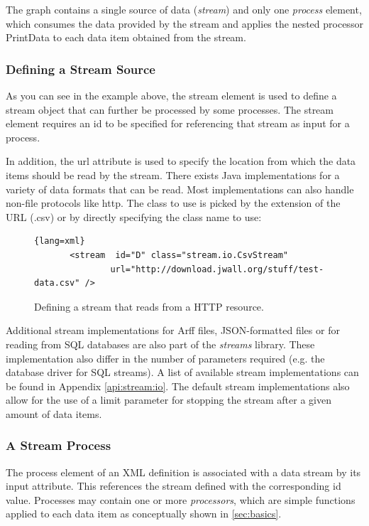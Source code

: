 The graph contains a single source of data ({\em stream}) and only
one {\em process} element, which consumes the data provided by the
stream and applies the nested processor {\ttfamily PrintData} to
each data item obtained from the stream.

\subsubsection{\label{sec:defineStream}Defining a Stream Source}
As you can see in the example above, the {\ttfamily stream} element is used to define
a stream object that can further be processed by some processes. The {\ttfamily stream}
element requires an {\ttfamily id} to be specified for referencing that stream as input
for a process. 

In addition, the {\ttfamily url} attribute is used to specify the location
from which the data items should be read by the stream. There exists Java implementations
for a variety of data formats that can be read. Most implementations can also handle 
non-file protocols like {\ttfamily http}. The class to use is picked by the extension
of the URL ({\ttfamily .csv}) or by directly specifying the class name to use:
\begin{figure}[h!]{\footnotesize
    \centering
    \begin{lstlisting}{lang=xml}
       <stream  id="D" class="stream.io.CsvStream"
               url="http://download.jwall.org/stuff/test-data.csv" />
    \end{lstlisting}
    \caption{\label{fig:defStream}Defining a stream that reads from a HTTP resource.}
}
\end{figure}

Additional stream implementations for Arff files, JSON-formatted files or for reading 
from SQL databases are also part of the {\em streams} library. These implementation
also differ in the number of parameters required (e.g. the database driver for SQL
streams). A list of available stream implementations can be found in Appendix \ref{api:stream:io}.
The default stream implementations also allow for the use of a {\ttfamily limit} parameter
for stopping the stream after a given amount of data items.

\subsubsection{A Stream Process}
The {\ttfamily process} element of an XML definition is associated
with a data stream by its {\ttfamily input} attribute. This references
the stream defined with the corresponding {\ttfamily id}
value. Processes may contain one or more {\em processors}, which are
simple functions applied to each data item as conceptually shown in
\ref{sec:basics}.

